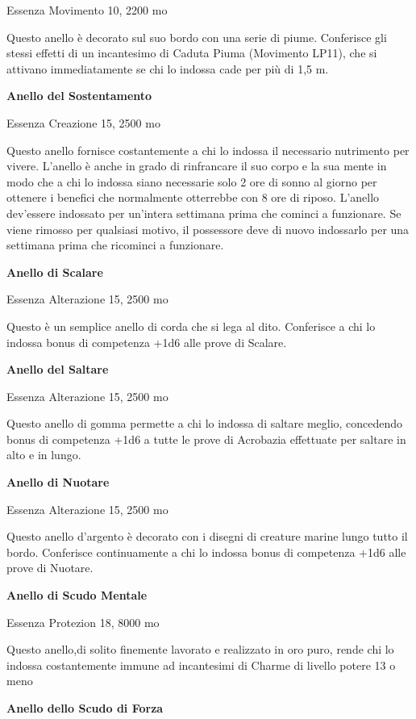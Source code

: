 \documentclass[a4paper,11pt,twoside,openany]{book}
\begin{document}
{Essenza Movimento 10, 2200 mo

Questo anello è decorato sul suo bordo con una serie di piume. Conferisce gli stessi effetti di un incantesimo di Caduta Piuma (Movimento LP11), che si attivano immediatamente se chi lo indossa cade per più di 1,5 m. 

\textbf{Anello del Sostentamento}

Essenza Creazione 15, 2500 mo

Questo anello fornisce costantemente a chi lo indossa il necessario nutrimento per vivere. L'anello è anche in grado di rinfrancare il suo corpo e la sua mente in modo che a chi lo indossa siano necessarie solo 2 ore di sonno al giorno per ottenere i benefici che normalmente otterrebbe con 8 ore di riposo. L'anello dev'essere indossato per un'intera settimana prima che cominci a funzionare. Se viene rimosso per qualsiasi motivo, il possessore deve di nuovo indossarlo per una settimana prima che ricominci a funzionare.

\textbf{Anello di Scalare}

Essenza Alterazione 15, 2500 mo

Questo è un semplice anello di corda che si lega al dito. Conferisce a chi lo indossa bonus di competenza +1d6 alle prove di Scalare.

\textbf{Anello del Saltare}

Essenza Alterazione 15, 2500 mo

Questo anello di gomma permette a chi lo indossa di saltare meglio, concedendo bonus di competenza +1d6 a tutte le prove di Acrobazia effettuate per saltare in alto e in lungo.

\textbf{Anello di Nuotare}

Essenza Alterazione 15, 2500 mo

Questo anello d'argento è decorato con i disegni di creature marine lungo tutto il bordo. Conferisce continuamente a chi lo indossa bonus di competenza +1d6 alle prove di Nuotare.

\textbf{Anello di Scudo Mentale}

Essenza Protezion 18, 8000 mo

Questo anello,di solito finemente lavorato e realizzato in oro puro, rende chi lo indossa costantemente immune ad incantesimi di Charme di livello potere 13 o meno

\textbf{Anello dello Scudo di Forza}

}
\end{document}
